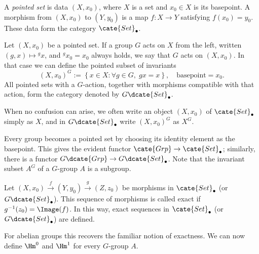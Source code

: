 \begin{definition}\label{def:pointed-set}
	A \emph{pointed set} is data $(X,x_0)$, where $X$ is a set and
	$x_0\in X$ is its basepoint. A morphism from $(X,x_0)$ to $(Y,y_0)$ is a
	map $f:X\to Y$ satisfying $f(x_0)=y_0$. These data form the category
	$\cate{Set}_\bullet$.

	Let $(X,x_0)$ be a pointed set. If a group $G$ acts on $X$ from the left,
	written $(g,x)\mapsto{}^gx$, and ${}^gx_0=x_0$ always holds, we say that
	$G$ acts on $(X,x_0)$. In that case we can define the pointed subset of
	invariants
	\[ (X, x_0)^G := \left\{ x \in X: \forall g \in G, \; gx = x \right\}, \quad \text{basepoint} = x_0. \]
	All pointed sets with a $G$-action, together with morphisms compatible
	with that action, form the category denoted by $G\dcate{Set}_\bullet$.
\end{definition}

When no confusion can arise, we often write an object $(X,x_0)$ of
$\cate{Set}_\bullet$ simply as $X$, and in $G\dcate{Set}_\bullet$ write
$(X,x_0)^G$ as $X^G$.

Every group becomes a pointed set by choosing its identity element as the
basepoint. This gives the evident functor
$\cate{Grp}\to\cate{Set}_\bullet$; similarly, there is a functor
$G\dcate{Grp}\to G\dcate{Set}_\bullet$. Note that the invariant subset
$A^G$ of a $G$-group $A$ is a subgroup.

\begin{definition}\label{def:pointed-exact}
	Let
	$(X,x_0)\xrightarrow{f}(Y,y_0)\xrightarrow{g}(Z,z_0)$ be morphisms in
	$\cate{Set}_\bullet$ (or $G\dcate{Set}_\bullet$). This sequence of
	morphisms is called exact if $g^{-1}(z_0)=\Image(f)$. In this way, exact
	sequences in $\cate{Set}_\bullet$ (or $G\dcate{Set}_\bullet$) are
	defined.
\end{definition}

For abelian groups this recovers the familiar notion of exactness. We can now
define $\Hm^0$ and $\Hm^1$ for every $G$-group $A$.

